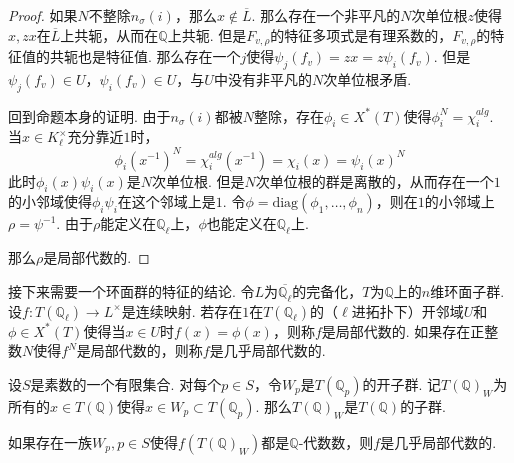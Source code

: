 \begin{proof}
    如果$N$不整除$n_{\sigma}(i)$，那么$x\not\in \overline{L}$. 那么存在一个非平凡的$N$次单位根$z$使得$x, zx$在$\overline{L}$上共轭，从而在$\mathbb{Q}$上共轭. 但是$F_{v,\rho}$的特征多项式是有理系数的，$F_{v,\rho}$的特征值的共轭也是特征值. 那么存在一个$j$使得$\psi_j(f_v) = zx = z\psi_i(f_v)$. 但是$\psi_j(f_v)\in U$，$\psi_i(f_v)\in U$，与$U$中没有非平凡的$N$次单位根矛盾.

    \vskip0.3cm

    回到命题本身的证明. 由于$n_{\sigma}(i)$都被$N$整除，存在$\phi_i\in X^{*}(T)$使得$\phi_i^N = \chi_i^{alg}$. 当$x\in K_{\ell}^{\times}$充分靠近$1$时，
    \begin{equation}
        \phi_i(x^{-1})^N = \chi_i^{alg}(x^{-1}) = \chi_i(x) = \psi_i(x)^N
    \end{equation}
    此时$\phi_i(x)\psi_i(x)$是$N$次单位根. 但是$N$次单位根的群是离散的，从而存在一个$1$的小邻域使得$\phi_i\psi_i$在这个邻域上是$1$. 令$\phi=\mathrm{diag}(\phi_1,\ldots,\phi_n)$，则在$1$的小邻域上$\rho = \psi^{-1}$. 由于$\rho$能定义在$\mathbb{Q}_{\ell}$上，$\phi$也能定义在$\mathbb{Q}_{\ell}$上.

    那么$\rho$是局部代数的.
\end{proof}

接下来需要一个环面群的特征的结论.
令$L$为$\overline{\mathbb{Q}_{\ell}}$的完备化，$T$为$\mathbb{Q}$上的$n$维环面子群.
设$f: T(\mathbb{Q}_{\ell})\to L^{\times}$是连续映射. 若存在$1$在$T(\mathbb{Q}_{\ell})$的（$\ell$进拓扑下）开邻域$U$和$\phi\in X^{*}(T)$使得当$x\in U$时$f(x)=\phi(x)$，则称$f$是局部代数的. 如果存在正整数$N$使得$f^N$是局部代数的，则称$f$是几乎局部代数的.

设$S$是素数的一个有限集合. 对每个$p\in S$，令$W_p$是$T(\mathbb{Q}_p)$的开子群. 记$T(\mathbb{Q})_{W}$为所有的$x\in T(\mathbb{Q})$使得$x\in W_p\subset T(\mathbb{Q}_p)$. 那么$T(\mathbb{Q})_{W}$是$T(\mathbb{Q})$的子群.

\begin{cprop}
    如果存在一族$W_p, p\in S$使得$f(T(\mathbb{Q})_W)$都是$\mathbb{Q}$-代数数，则$f$是几乎局部代数的. \label{temp::reps::loc_alg}
\end{cprop}

